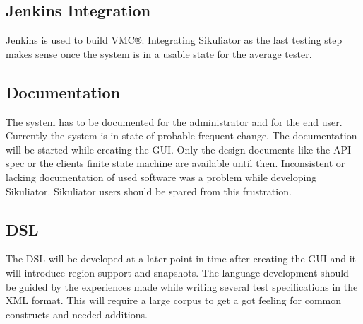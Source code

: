 \documentclass[a4paper,twocolumn,twoside]{article}
\newcommand{\VMC}[0]{VMC®}
\newcommand{\Sik}[0]{Sikuliator}
\begin{document}
\subsection*{Jenkins Integration}
Jenkins is used to build \VMC{}.
Integrating \Sik{} as the last testing step makes sense once the system is in a usable state for the average tester.

\subsection*{Documentation}
The system has to be documented for the administrator and for the end user.
Currently the system is in state of probable frequent change.
The documentation will be started while creating the GUI. 
Only the design documents like the API spec or the clients finite state machine are available until then.
Inconsistent or lacking documentation of used software was a problem while developing \Sik{}.
\Sik{} users should be spared from this frustration.

\subsection*{DSL}
The DSL will be developed at a later point in time after creating the GUI and it will introduce region support and snapshots.
The language development should be guided by the experiences made while writing several test specifications in the XML format.
This will require a large corpus to get a got feeling for common constructs and needed additions.





\printbibliography[notkeyword=software,resetnumbers=true,prefixnumbers=R]
\printbibliography[keyword=used,title={Used software},resetnumbers=true,prefixnumbers=US]
\printbibliography[notkeyword=used,keyword=software,title={Other software},resetnumbers=true,prefixnumbers=OS]
\end{document}
